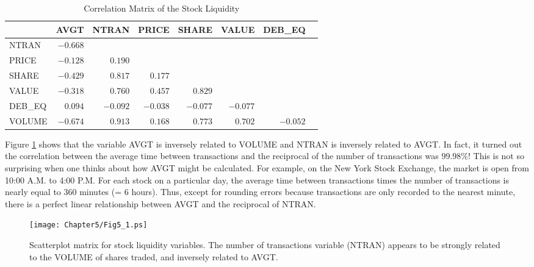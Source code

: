 \begin{table}[h]

\caption{\label{T5:LiquidCorr} Correlation Matrix of the Stock
Liquidity}
\begin{tabular}{lrrrrrrr}
\hline & AVGT & NTRAN & PRICE & SHARE & VALUE & DEB\_EQ \\ \hline
\multicolumn{1}{l}{NTRAN} & $-0.668$ &  &  &  &  &  \\
\multicolumn{1}{l}{PRICE} & $-0.128$ & $0.190$ &  &  &  &  \\
\multicolumn{1}{l}{SHARE} & $-0.429$ & $0.817$ & $0.177$ &  &  &  \\
\multicolumn{1}{l}{VALUE} & $-0.318$ & $0.760$ & $0.457$ & $0.829$ &  &  \\
\multicolumn{1}{l}{DEB\_EQ} & $0.094$ & $-0.092$ & $-0.038$ & $-0.077$ & $%
-0.077$ &  \\
\multicolumn{1}{l}{VOLUME} & $-0.674$ & $0.913$ & $0.168$ & $0.773$ & $0.702$
& $-0.052$ \\ \hline
\end{tabular}
\end{table}

Figure \ref{F5:LiquidPlot} shows that the variable AVGT is inversely
related to VOLUME and NTRAN is inversely related to AVGT. In fact,
it turned out the correlation between the average time between
transactions and the reciprocal of the number of transactions was
$99.98\%$! This is not so surprising when one thinks about how AVGT
might be calculated. For example, on the New York Stock Exchange,
the market is open from 10:00 A.M. to 4:00 P.M. For each stock on a
particular day, the average time between transactions times the
number of transactions is nearly equal to 360 minutes (= 6 hours).
Thus, except for rounding errors because transactions are only
recorded to the nearest minute, there is a perfect linear
relationship between AVGT and the reciprocal of NTRAN.


\begin{figure}[htp]
  \begin{center}
    \texttt{[image: Chapter5/Fig5\_1.ps]}
    \caption{\label{F5:LiquidPlot} \small  Scatterplot matrix for
stock liquidity variables. The number of transactions variable
(NTRAN) appears to be strongly related to the VOLUME of shares
traded, and inversely related to AVGT.}
  \end{center}
\end{figure}


